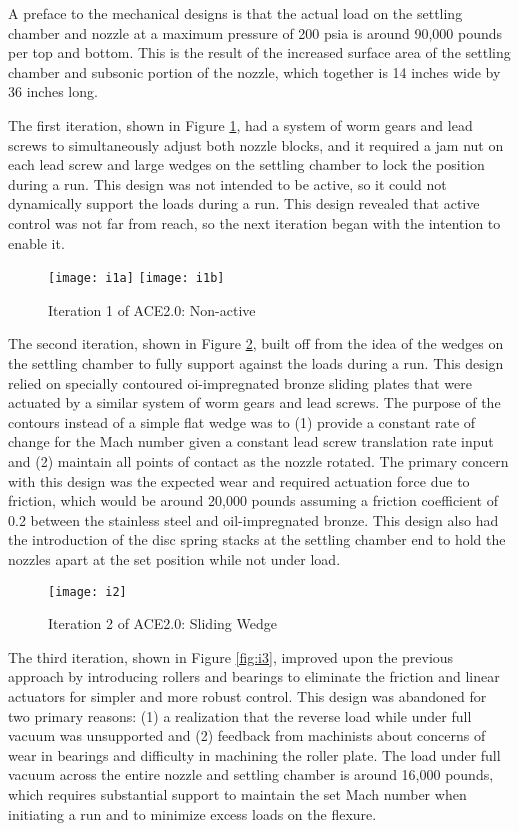 A preface to the mechanical designs is that the actual load on the settling chamber and nozzle at a maximum pressure of 200 psia is around 90,000 pounds per top and bottom. This is the result of the increased surface area of the settling chamber and subsonic portion of the nozzle, which together is 14 inches wide by 36 inches long.

The first iteration, shown in Figure \ref{fig:i1}, had a system of worm gears and lead screws to simultaneously adjust both nozzle blocks, and it required a jam nut on each lead screw and large wedges on the settling chamber to lock the position during a run. This design was not intended to be active, so it could not dynamically support the loads during a run. This design revealed that active control was not far from reach, so the next iteration began with the intention to enable it.

\begin{figure}[ht!]
    \centering
    \texttt{[image: i1a]}
    \texttt{[image: i1b]}
    \caption{Iteration 1 of ACE2.0: Non-active}
    \label{fig:i1}
\end{figure}

The second iteration, shown in Figure \ref{fig:i2}, built off from the idea of the wedges on the settling chamber to fully support against the loads during a run. This design relied on specially contoured oi-impregnated bronze sliding plates that were actuated by a similar system of worm gears and lead screws. The purpose of the contours instead of a simple flat wedge was to (1) provide a constant rate of change for the Mach number given a constant lead screw translation rate input and (2) maintain all points of contact as the nozzle rotated. The primary concern with this design was the expected wear and required actuation force due to friction, which would be around 20,000 pounds assuming a friction coefficient of 0.2 between the stainless steel and oil-impregnated bronze. This design also had the introduction of the disc spring stacks at the settling chamber end to hold the nozzles apart at the set position while not under load. 

\begin{figure}[ht!]
    \centering
    \texttt{[image: i2]}
    \caption{Iteration 2 of ACE2.0: Sliding Wedge}
    \label{fig:i2}
\end{figure}

The third iteration, shown in Figure \ref{fig:i3}, improved upon the previous approach by introducing rollers and bearings to eliminate the friction and linear actuators for simpler and more robust control. This design was abandoned for two primary reasons: (1) a realization that the reverse load while under full vacuum was unsupported and (2) feedback from machinists about concerns of wear in bearings and difficulty in machining the roller plate. The load under full vacuum across the entire nozzle and settling chamber is around 16,000 pounds, which requires substantial support to maintain the set Mach number when initiating a run and to minimize excess loads on the flexure.

